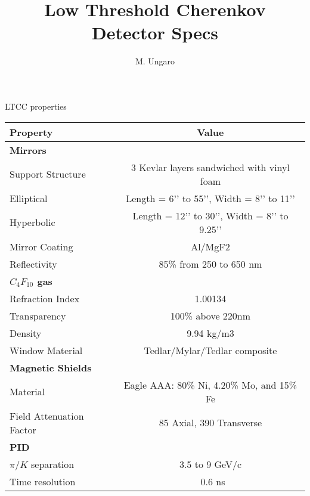 \documentclass{article}
\begin{document}
\pagestyle{fancy}
\renewcommand{\sectionmark}[1]{\markright{\slshape \thesection\ #1}{}}
\fancyhead[R]{\bf\rightmark} 

\title{\large Low Threshold Cherenkov Detector Specs}
 \author{M. Ungaro}
\maketitle

\begin{center}
LTCC properties\\
\begin{tabular}{| l | c |}
\hline \hline
Property                 & Value \\
\hline
{\bf Mirrors}            &                                              \\
Support Structure        & 3 Kevlar layers sandwiched with vinyl foam   \\
Elliptical               & Length = 6’’ to 55’’, Width = 8’’ to 11’’    \\ 
Hyperbolic               & Length = 12’’ to 30’’, Width = 8’’ to 9.25’’ \\
Mirror Coating           & Al/MgF2                                      \\
Reflectivity             & 85\% from 250 to 650 nm                      \\
{\bf $C_4F_{10}$ gas}    &                                              \\
Refraction Index         & 1.00134                                      \\
Transparency             & 100\% above 220nm                            \\
Density                  & 9.94 kg/m3                                   \\
Window Material          & Tedlar/Mylar/Tedlar composite                \\
{\bf Magnetic Shields}   &                                              \\
Material                 & Eagle AAA: 80\% Ni, 4.20\% Mo, and 15\% Fe   \\
Field Attenuation Factor &  85 Axial, 390 Transverse                    \\
{\bf PID}                &                                              \\
$\pi/K$ separation       &  3.5 to 9 GeV/c                              \\
Time resolution          &  ~0.6 ns                                     \\
\hline \hline
\end{tabular}
\end{center}
\end{document}
